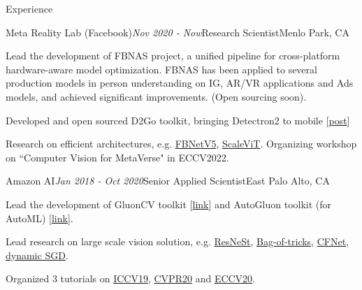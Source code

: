 \documentclass{resume} %
\begin{document}
\begin{rSection}{Experience}

\begin{rSubsection}{Meta Reality Lab (Facebook)}{\em Nov 2020 - Now}{Research Scientist}{Menlo Park, CA} %
\item Lead the development of FBNAS project, a unified pipeline for cross-platform hardware-aware model optimization. FBNAS has been applied to several production models in person understanding on IG, AR/VR applications and Ads models, and achieved significant improvements. (Open sourcing soon).
\item Developed and open sourced D2Go toolkit, bringing Detectron2 to mobile [\href{https://ai.facebook.com/blog/d2go-brings-detectron2-to-mobile/}{post}]
\item Research on efficient architectures, e.g. \href{https://scholar.google.com/citations?view_op=view_citation&hl=en&user=gCoWdkUAAAAJ&sortby=pubdate&citation_for_view=gCoWdkUAAAAJ:ML0RJ9NH7IQC}{FBNetV5}, \href{https://scholar.google.com/citations?view_op=view_citation&hl=en&user=gCoWdkUAAAAJ&sortby=pubdate&citation_for_view=gCoWdkUAAAAJ:p__nRnzSRKYC}{ScaleViT}. Organizing workshop on ``Computer Vision for MetaVerse" in ECCV2022.
\end{rSubsection}

\begin{rSubsection}{Amazon AI}{\em Jan 2018 - Oct 2020}{Senior Applied Scientist}{East Palo Alto, CA} %
\item Lead the development of GluonCV toolkit [\href{https://cv.gluon.ai/contents.html}{link}] and AutoGluon toolkit (for AutoML) [\href{https://auto.gluon.ai/stable/index.html}{link}]. 
\item Lead research on large scale vision solution, e.g. \href{https://scholar.google.com/citations?view_op=view_citation&hl=en&user=gCoWdkUAAAAJ&citation_for_view=gCoWdkUAAAAJ:0KyAp5RtaNEC}{ResNeSt}, \href{https://scholar.google.com/citations?view_op=view_citation&hl=en&user=gCoWdkUAAAAJ&citation_for_view=gCoWdkUAAAAJ:fEOibwPWpKIC}{Bag-of-tricks}, \href{https://scholar.google.com/citations?view_op=view_citation&hl=en&user=gCoWdkUAAAAJ&citation_for_view=gCoWdkUAAAAJ:-_dYPAW6P2MC}{CFNet}, \href{https://scholar.google.com/citations?view_op=view_citation&hl=en&user=gCoWdkUAAAAJ&sortby=pubdate&citation_for_view=gCoWdkUAAAAJ:35r97b3x0nAC}{dynamic SGD}. 
\item Organized 3 tutorials on \href{https://iccv2019.thecvf.com/program/tutorials}{ICCV19}, \href{http://hangzhang.org/CVPR2020/}{CVPR20} and \href{https://hangzhang.org/ECCV2020/}{ECCV20}. 
\end{rSubsection}


\end{rSection}
\end{document}
